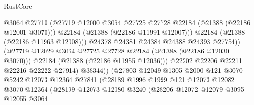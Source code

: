 \begin{lexlean}{RustCore}
\begin{coremodule}
                                        @3064
                                        @27710
                                        (@27719
                                          @12000
                                          @3064
                                          @27725
                                          @27728
                                          @22184
                                          (@21388 (@22186 @12001 @3070)))
                                        @22184
                                        (@21388 (@22186 @11991 @12007)))
                                      @22184
                                      (@21388 (@22186 @11963 @12008)))
                                    @24378
                                    @24381
                                    @24384
                                    @24388
                                    @24393
                                    @27754))
                                (@27719
                                  @12029
                                  @3064
                                  @27725
                                  @27728
                                  @22184
                                  (@21388 (@22186 @12030 @3070)))
                                @22184
                                (@21388 (@22186 @11955 @12036)))
                              @22202
                              @22206
                              @22211
                              @22216
                              @22222
                              @27914)
                            @38344))
                        (@27803
                          @12049
                          @1305
                          @2000
                          @121
                          @3070
                          @5242
                          @12073
                          @12364
                          @27841
                          (@28189
                            @1996
                            @1999
                            @121
                            @12073
                            @12082
                            @3070
                            @12364
                            (@28199
                              @12073
                              @12080
                              @3240
                              (@28206
                                @12072
                                @12079
                                @3095
                                @12055
                                @3064

\end{coremodule}
\end{lexlean}
